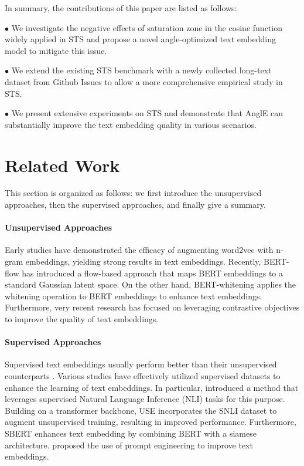 \documentclass{article} \usepackage{iclr2024_conference,times}
\begin{document}
In summary, the contributions of this paper are listed as follows: 

$\bullet$ We investigate the negative effects of saturation zone in the cosine function widely applied in STS and propose a novel angle-optimized text embedding model to mitigate this issue.

$\bullet$ We extend the existing STS benchmark with a newly collected long-text dataset from Github Issues to allow a more comprehensive empirical study in STS.

$\bullet$ We present extensive experiments on STS and demonstrate that AnglE can substantially improve the text embedding quality in various scenarios.




\section{Related Work}
This section is organized as follows: we first introduce the unsupervised approaches, then the supervised approaches, and finally give a summary.

\paragraph{Unsupervised Approaches} Early studies \citep{DBLP:conf/naacl/HillCK16,pagliardini-etal-2018-unsupervised} have demonstrated the efficacy of augmenting word2vec \citep{word2vec_mikolov_2013} with n-gram embeddings, yielding strong results in text embeddings.
Recently, BERT-flow \citep{li-etal-2020-sentence} has introduced a flow-based approach that maps BERT embeddings to a standard Gaussian latent space. On the other hand, BERT-whitening \citep{su2021whitening} applies the whitening operation to BERT embeddings to enhance text embeddings.
Furthermore, very recent research \citep{carlsson2020semantic, zhang-etal-2020-unsupervised, giorgi-etal-2021-declutr, simcse_gao_2021, consert_yan_2021, chuang-etal-2022-diffcse, promcse_jiang_2022, zhuo-etal-2023-whitenedcse} has focused on leveraging contrastive objectives to improve the quality of text embeddings.

\paragraph{Supervised Approaches} Supervised text embeddings usually perform better than their unsupervised counterparts \citep{simcse_gao_2021}. Various studies have effectively utilized supervised datasets to enhance the learning of text embeddings. In particular, \citet{conneau-etal-2017-supervised} introduced a method that leverages supervised Natural Language Inference (NLI) tasks for this purpose. Building on a transformer backbone, USE \citep{cer-etal-2018-universal} incorporates the SNLI dataset to augment unsupervised training, resulting in improved performance. Furthermore, SBERT \citep{sbert-nils-2019} enhances text embedding by combining BERT with a siamese architecture. \citet{jiang-etal-2022-promptbert,jiang2023scaling} proposed the use of prompt engineering to improve text embeddings.
\end{document}
